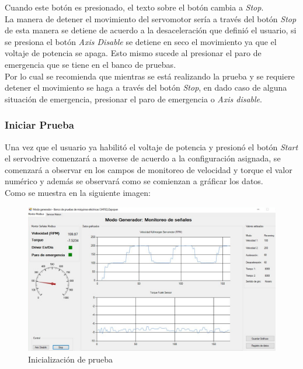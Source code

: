 \documentclass[12pt,titlepage]{article}
\begin{document}
Cuando este botón es presionado, el texto sobre el botón cambia a \textit{Stop}. \\

La manera de detener el movimiento del servomotor sería a través del botón \textit{Stop} de esta manera se detiene de acuerdo a la desaceleración que definió el usuario, si se presiona el botón \textit{Axis Disable} se detiene en seco el movimiento ya que el voltaje de potencia se apaga. Esto mismo sucede al presionar el paro de emergencia que se tiene en el banco de pruebas. \\

Por lo cual se recomienda que mientras se está realizando la prueba y se requiere detener el movimiento  se haga a través del botón \textit{Stop}, en dado caso de alguna situación de emergencia, presionar el paro de emergencia o \textit{Axis disable}.

\subsubsection{Iniciar Prueba}
Una vez que el usuario ya habilitó el voltaje de potencia y presionó el botón \textit{Start} el servodrive comenzará a moverse de acuerdo a la configuración asignada, se comenzará a observar en los campos de monitoreo de velocidad y torque el valor numérico y además se observará como se comienzan a gráficar los datos. \\ 

Como se muestra en la siguiente imagen: \\ 
\newpage

\begin{figure}[htbp]
\hspace*{0.1cm} 
\includegraphics[scale=0.55]{Initi_move2}
\caption{Inicialización de prueba }
\end{figure}
 
\end{document}
